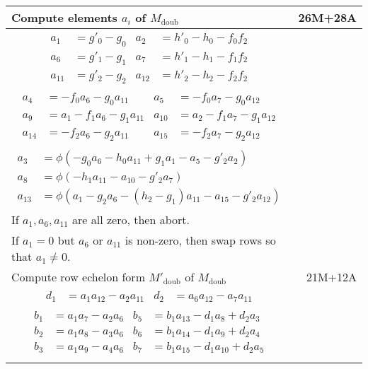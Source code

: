 \pagebreak
\begin{tabularx}{\linewidth}{|Xr|}
  \hline
  Compute elements $a_i$ of $M_{\text{doub}}$ & 26M+28A \\
  \hline
  {\begin{align*}
    a_1    &= g'_0 - g_0 & a_2    &= h'_0 - h_0 - f_0f_2 \\
    a_6    &= g'_1 - g_1 & a_7    &= h'_1 - h_1 - f_1f_2 \\
    a_{11} &= g'_2 - g_2 & a_{12} &= h'_2 - h_2 - f_2f_2
  \end{align*}} & \\
  {\begin{align*}
    a_4    &=     - f_0a_6 - g_0a_{11} & a_5    &=     - f_0a_7 - g_0a_{12} \\
    a_9    &= a_1 - f_1a_6 - g_1a_{11} & a_{10} &= a_2 - f_1a_7 - g_1a_{12} \\
    a_{14} &=     - f_2a_6 - g_2a_{11} & a_{15} &=     - f_2a_7 - g_2a_{12}
  \end{align*}} & \\
  {\begin{align*}
    a_3    &= \phi \left(     - g_0a_6 - h_0a_{11} + g_1a_1    - a_5    - g'_2a_2    \right) \\
    a_8    &= \phi \left(              - h_1a_{11}             - a_{10} - g'_2a_7    \right) \\
    a_{13} &= \phi \left( a_1 - g_2a_6 - (h_2 - g_1)a_{11}     - a_{15} - g'_2a_{12} \right)
  \end{align*}} & \\
  If $a_1, a_6, a_{11}$ are all zero, then abort. & \\
  If $a_1 = 0$ but $a_6$ or $a_{11}$ is non-zero, then swap rows so that $a_1 \neq 0$. & \\
  \hline
  Compute row echelon form $M'_{\text{doub}}$ of $M_{\text{doub}}$ & 21M+12A \\
  \hline
  {\begin{align*}
    d_1 &= a_1a_{12} - a_2a_{11} & d_2 &= a_6a_{12} - a_7a_{11} 
  \end{align*}} & \\
  {\begin{align*}
    b_1 &= a_1a_7    - a_2a_6 & b_5 &= b_1a_{13} - d_1a_8    + d_2a_3 \\
    b_2 &= a_1a_8    - a_3a_6 & b_6 &= b_1a_{14} - d_1a_9    + d_2a_4 \\
    b_3 &= a_1a_9    - a_4a_6 & b_7 &= b_1a_{15} - d_1a_{10} + d_2a_5 \\

\end{align*}}
\end{tabularx}
